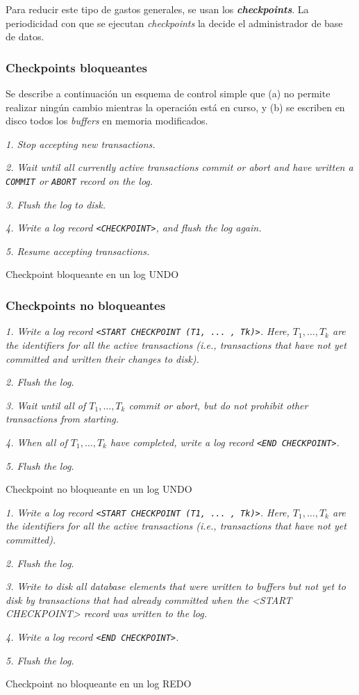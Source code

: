 \documentclass[a4paper, twoside]{article}
\begin{document}
Para reducir este tipo de gastos generales, se usan los \textbf{\emph{checkpoints}}. La periodicidad con que se ejecutan \emph{checkpoints} la decide el administrador de base de datos.

\subsubsection{Checkpoints bloqueantes}
Se describe a continuación un esquema de control simple que (a) no permite realizar ningún cambio mientras la operación está en curso, y (b) se escriben en disco todos los \emph{buffers} en memoria modificados. 

\begin{algorithm}[H]
	\emph{1. Stop accepting new transactions.}

	\emph{2. Wait until all currently active transactions commit or abort and have written a \texttt{COMMIT} or \texttt{ABORT} record on the log.}

	\emph{3. Flush the log to disk.}

	\emph{4. Write a log record \texttt{<CHECKPOINT>}, and flush the log again.}

	\emph{5. Resume accepting transactions.}
	\caption{Checkpoint bloqueante en un log UNDO}
\end{algorithm}

\subsubsection{Checkpoints no bloqueantes}
\begin{algorithm}[H]
	\emph{1. Write a log record \texttt{<START CHECKPOINT (T1, ... , Tk)>}. Here, $T_{1},\ldots,T_{k}$ are the identifiers for all the active transactions (i.e., transactions that have not yet committed and written their changes to disk).}

	\emph{2. Flush the log.}

	\emph{3. Wait until all of $T_{1},\ldots,T_{k}$ commit or abort, but do not prohibit other transactions from starting.}

	\emph{4. When all of $T_{1}, \ldots, T_{k}$ have completed, write a log record \texttt{<END CHECKPOINT>}.}

	\emph{5. Flush the log.}
	\caption{Checkpoint no bloqueante en un log UNDO}
\end{algorithm}

\begin{algorithm}[H]
	\emph{1. Write a log record \texttt{<START CHECKPOINT (T1, ... , Tk)>}. Here, $T_{1}, \ldots, T_{k}$ are the identifiers for all the active transactions (i.e., transactions that have not yet committed).}

	\emph{2. Flush the log.}

	\emph{3. Write to disk all database elements that were written to buffers but not yet to disk by transactions that had already committed when the <START CHECKPOINT> record was written to the log.}

	\emph{4. Write a log record \texttt{<END CHECKPOINT>}.}

	\emph{5. Flush the log.}
	\caption{Checkpoint no bloqueante en un log REDO}
\end{algorithm}
\end{document}
